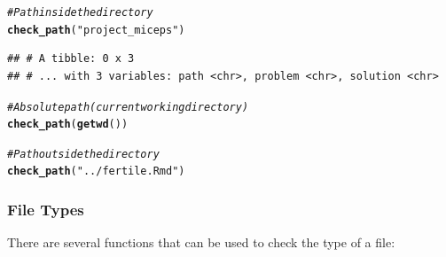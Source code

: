 \documentclass[APA,LATO1COL]{WileyNJD-v2}\usepackage[]{graphicx}\usepackage[]{color}
\makeatletter
\newcommand{\hlstr}[1]{\textcolor[rgb]{0.192,0.494,0.8}{#1}}%
\newcommand{\hlcom}[1]{\textcolor[rgb]{0.678,0.584,0.686}{\textit{#1}}}%
\newcommand{\hlstd}[1]{\textcolor[rgb]{0.345,0.345,0.345}{#1}}%
\newcommand{\hlkwd}[1]{\textcolor[rgb]{0.737,0.353,0.396}{\textbf{#1}}}%
\newenvironment{kframe}{%
 \def\at@end@of@kframe{}%
 \ifinner\ifhmode%
  \def\at@end@of@kframe{\end{minipage}}%
  \begin{minipage}{\columnwidth}%
 \fi\fi%
 \def\FrameCommand##1{\hskip\@totalleftmargin \hskip-\fboxsep
 \colorbox{shadecolor}{##1}\hskip-\fboxsep
     \hskip-\linewidth \hskip-\@totalleftmargin \hskip\columnwidth}%
 \MakeFramed {\advance\hsize-\width
   \@totalleftmargin\z@ \linewidth\hsize
   \@setminipage}}%
 {\par\unskip\endMakeFramed%
 \at@end@of@kframe}
\newenvironment{knitrout}{}{} %
\makeatother
\begin{document}
\begin{knitrout}
\color{fgcolor}\begin{kframe}
\begin{alltt}
\hlcom{# Path inside the directory}
\hlkwd{check_path}\hlstd{(}\hlstr{"project_miceps"}\hlstd{)}
\end{alltt}
\begin{verbatim}
## # A tibble: 0 x 3
## # ... with 3 variables: path <chr>, problem <chr>, solution <chr>
\end{verbatim}
\begin{alltt}
\hlcom{# Absolute path (current working directory)}
\hlkwd{check_path}\hlstd{(}\hlkwd{getwd}\hlstd{())}
\end{alltt}


{\ttfamily\noindent\bfseries\color{errorcolor}{\#\# Error: Detected absolute paths}}\begin{alltt}
\hlcom{# Path outside the directory}
\hlkwd{check_path}\hlstd{(}\hlstr{"../fertile.Rmd"}\hlstd{)}
\end{alltt}


{\ttfamily\noindent\bfseries\color{errorcolor}{\#\# Error: Detected paths that lead outside the project directory}}\end{kframe}
\end{knitrout}

\subsubsection{File Types}

There are several functions that can be used to check the type of a file: 
\end{document}
